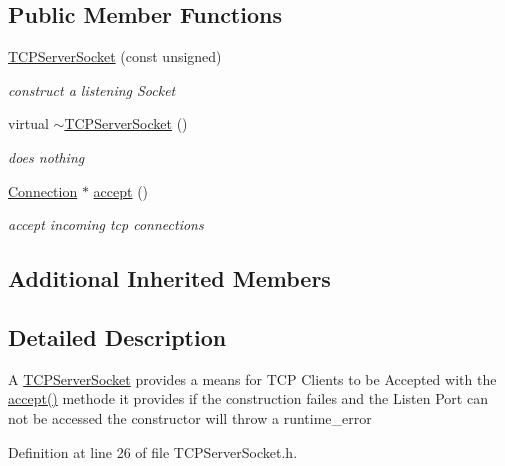\subsection*{Public Member Functions}
\begin{DoxyCompactItemize}
\item 
\hyperlink{classTCPServerSocket_a2a54360b0df69bbbbd088bb60ba1c93a}{T\+C\+P\+Server\+Socket} (const unsigned)
\begin{DoxyCompactList}\small\item\em construct a listening Socket \end{DoxyCompactList}\item 
virtual \hyperlink{classTCPServerSocket_ac585f0ee1919733ec028dadf9c204ddf}{$\sim$\+T\+C\+P\+Server\+Socket} ()
\begin{DoxyCompactList}\small\item\em does nothing \end{DoxyCompactList}\item 
\hyperlink{classConnection}{Connection} $\ast$ \hyperlink{classTCPServerSocket_a0c169a85290095c3c58b9fae38a1a1d0}{accept} ()
\begin{DoxyCompactList}\small\item\em accept incoming tcp connections \end{DoxyCompactList}\end{DoxyCompactItemize}
\subsection*{Additional Inherited Members}


\subsection{Detailed Description}
A \hyperlink{classTCPServerSocket}{T\+C\+P\+Server\+Socket} provides a means for T\+C\+P Clients to be Accepted with the \hyperlink{classTCPServerSocket_a0c169a85290095c3c58b9fae38a1a1d0}{accept()} methode it provides if the construction failes and the Listen Port can not be accessed the constructor will throw a runtime\+\_\+error 

Definition at line 26 of file T\+C\+P\+Server\+Socket.\+h.



